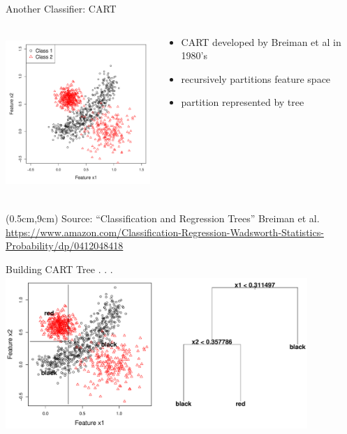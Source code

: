 \documentclass[12pt]{beamer}
\newcommand{\att}[1]{\begin{textblock*}{12cm}(0.5cm,9cm) %
  {\tiny Source: #1}
      \end{textblock*}}
\begin{document}
\begin{frame}{Another Classifier: CART}
\begin{columns}[T] %

\begin{column}{.5\textwidth}
\includegraphics[height=2.3in,width=2.3in]{figs/training.pdf}
\end{column}
\begin{column}{.5\textwidth}
\begin{itemize}
\item CART developed by Breiman et al in 1980's 
\item recursively partitions feature space
\item partition represented by tree
\end{itemize}
\end{column}


\end{columns}

\att{``Classification and Regression Trees'' Breiman et al. \url{https://www.amazon.com/Classification-Regression-Wadsworth-Statistics-Probability/dp/0412048418}\\}
\end{frame}

\begin{frame}{Building CART Tree . . .}
\includegraphics[height=2.3in,width=4.5in]{figs/tree_2.pdf}
\end{frame}
\end{document}
